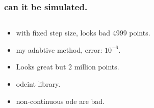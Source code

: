 \documentclass{beamer}
\begin{document}
\begin{frame}
\frametitle{can it be simulated.}
\begin{columns}
\begin{column}{0.5\linewidth}
\begin{itemize}
\item<1-> with fixed step size, looks bad 4999 points.

\item<2- > my adabtive method, error: $10^{-6}$.

\item<2- > Looks great but 2 million points.

\item<3-> odeint library.

\item<4-> non-continuous ode are bad.

\end{itemize}
\end{column}
\begin{column}{0.5\linewidth}
\end{column}
\end{columns}
\end{frame}
\end{document}
